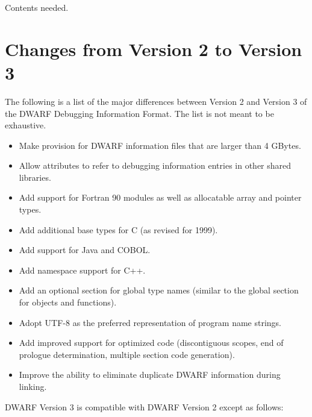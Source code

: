 Contents needed.
\section{Changes from Version 2 to Version 3}
The following is a list of the major differences between
Version 2 and Version 3 of the DWARF Debugging Information
Format. The list is not meant to be exhaustive.

\begin{itemize}
\item
Make provision for DWARF information files that are larger
than 4 GBytes.

\item
Allow attributes to refer to debugging information entries
in other shared libraries.

\item
Add support for Fortran 90 modules as well as allocatable
array and pointer types.

\item
Add additional base types for C (as revised for 1999).

\item
Add support for Java and COBOL.

\item
Add namespace support for C++.

\item
Add an optional section for global type names (similar to
the global section for objects and functions).

\item
Adopt UTF-8 as the preferred representation of program name strings.
\item
Add improved support for optimized code (discontiguous
scopes, end of prologue determination, multiple section
code generation).  

\item Improve the ability to eliminate
duplicate DWARF information during linking.  

\end{itemize}

DWARF Version 3 is compatible with DWARF Version 2 except as follows:

